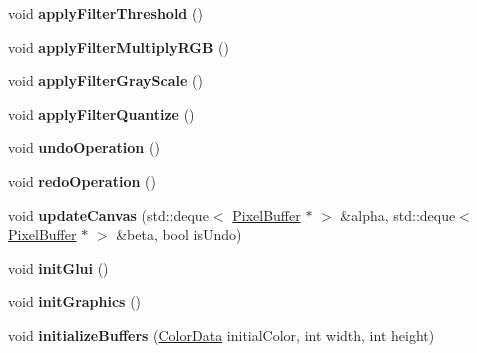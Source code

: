 \begin{DoxyCompactItemize}
\item 
void {\bfseries apply\+Filter\+Threshold} ()\hypertarget{classMIAApp_aa3ad00c603fde42c8214c41c973f27f7}{}\label{classMIAApp_aa3ad00c603fde42c8214c41c973f27f7}

\item 
void {\bfseries apply\+Filter\+Multiply\+R\+GB} ()\hypertarget{classMIAApp_adef6799fa8f0bcf49332285b5b861c93}{}\label{classMIAApp_adef6799fa8f0bcf49332285b5b861c93}

\item 
void {\bfseries apply\+Filter\+Gray\+Scale} ()\hypertarget{classMIAApp_a774c68949c28f8287c8c6300274b3dd0}{}\label{classMIAApp_a774c68949c28f8287c8c6300274b3dd0}

\item 
void {\bfseries apply\+Filter\+Quantize} ()\hypertarget{classMIAApp_a708eab74083f7ae60c5d012544da628e}{}\label{classMIAApp_a708eab74083f7ae60c5d012544da628e}

\item 
void {\bfseries undo\+Operation} ()\hypertarget{classMIAApp_a9a16cbd589ab8ac59bedc4d7e49a5dc3}{}\label{classMIAApp_a9a16cbd589ab8ac59bedc4d7e49a5dc3}

\item 
void {\bfseries redo\+Operation} ()\hypertarget{classMIAApp_ab8ddeb7eb01eb8bf4cdb4207f8a21b1b}{}\label{classMIAApp_ab8ddeb7eb01eb8bf4cdb4207f8a21b1b}

\item 
void {\bfseries update\+Canvas} (std\+::deque$<$ \hyperlink{classPixelBuffer}{Pixel\+Buffer} $\ast$ $>$ \&alpha, std\+::deque$<$ \hyperlink{classPixelBuffer}{Pixel\+Buffer} $\ast$ $>$ \&beta, bool is\+Undo)\hypertarget{classMIAApp_a1bb9e81c74e984224b38749f8df32800}{}\label{classMIAApp_a1bb9e81c74e984224b38749f8df32800}

\item 
void {\bfseries init\+Glui} ()\hypertarget{classMIAApp_a1ae83a224a7c642401788e2c17701ac2}{}\label{classMIAApp_a1ae83a224a7c642401788e2c17701ac2}

\item 
void {\bfseries init\+Graphics} ()\hypertarget{classMIAApp_a0fea18478d7de16109386d4e93c3ebbf}{}\label{classMIAApp_a0fea18478d7de16109386d4e93c3ebbf}

\item 
void {\bfseries initialize\+Buffers} (\hyperlink{classColorData}{Color\+Data} initial\+Color, int width, int height)\hypertarget{classMIAApp_ac754b2ce1a9a5afe03822cca5345ac53}{}\label{classMIAApp_ac754b2ce1a9a5afe03822cca5345ac53}


\end{DoxyCompactItemize}
